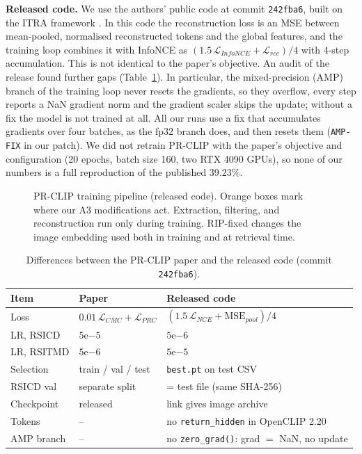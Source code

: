 \documentclass[conference]{IEEEtran}
\begin{document}
\textbf{Released code.} We use the authors' public code \cite{prclipcode} at commit \texttt{242fba6}, built on the ITRA framework \cite{itra}. In this code the reconstruction loss is an MSE between mean-pooled, normalised reconstructed tokens and the global features, and the training loop combines it with InfoNCE as $(1.5\,\mathcal{L}_{InfoNCE} + \mathcal{L}_{rec})/4$ with 4-step accumulation. This is not identical to the paper's objective. An audit of the release found further gaps (Table~\ref{tab:audit}). In particular, the mixed-precision (AMP) branch of the training loop never resets the gradients, so they overflow, every step reports a NaN gradient norm and the gradient scaler skips the update; without a fix the model is not trained at all. All our runs use a fix that accumulates gradients over four batches, as the fp32 branch does, and then resets them (\texttt{AMP-FIX} in our patch). We did not retrain PR-CLIP with the paper's objective and configuration (20 epochs, batch size 160, two RTX 4090 GPUs), so none of our numbers is a full reproduction of the published 39.23\%.

\begin{figure}[t]
\centering
\resizebox{0.92\textwidth}{!}{}
\caption{PR-CLIP training pipeline (released code). Orange boxes mark where our A3 modifications act. Extraction, filtering, and reconstruction run only during training. RIP-fixed changes the image embedding used both in training and at retrieval time.}
\label{fig:arch}
\end{figure}


\begin{table}[t]
\centering
\caption{Differences between the PR-CLIP paper and the released code (commit \texttt{242fba6}).}
\label{tab:audit}
\scriptsize
\setlength{\tabcolsep}{3pt}
\begin{tabular}{@{}lll@{}}
\toprule
Item & Paper & Released code \\
\midrule
Loss & $0.01\,\mathcal{L}_{CMC}+\mathcal{L}_{PRC}$ & $(1.5\,\mathcal{L}_{NCE}+\mathrm{MSE}_{pool})/4$ \\
LR, RSICD & $5\mathrm{e}{-5}$ & $5\mathrm{e}{-6}$ \\
LR, RSITMD & $5\mathrm{e}{-6}$ & $5\mathrm{e}{-5}$ \\
Selection & train / val / test & \texttt{best.pt} on test CSV \\
RSICD val & separate split & = test file (same SHA-256) \\
Checkpoint & released & link gives image archive \\
Tokens & -- & no \texttt{return\_hidden} in OpenCLIP 2.20 \\
AMP branch & -- & no \texttt{zero\_grad()}: grad $=$ NaN, no update \\
\bottomrule
\end{tabular}
\end{table}
\end{document}
